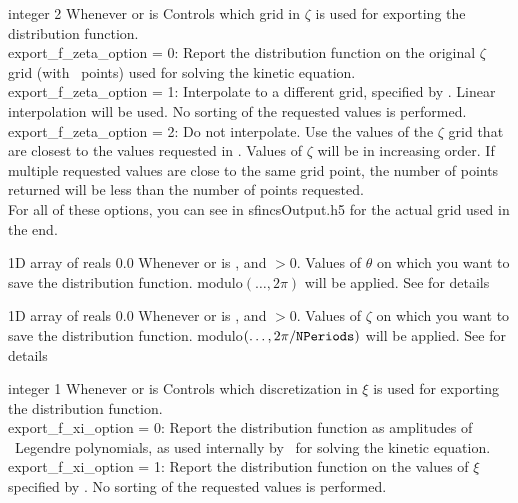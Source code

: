 \myhrule

{integer}
{2}
{Whenever  or  is \true}
{Controls which grid in $\zeta$ is used for exporting the distribution function.\\

{\ttfamily export\_f\_zeta\_option} = 0: Report the distribution function on the original $\zeta$ grid (with \Nzeta~points) used for solving the kinetic equation.\\

{\ttfamily export\_f\_zeta\_option} = 1: Interpolate to a different grid, specified by . Linear interpolation will be used.
No sorting of the requested values is performed.\\

{\ttfamily export\_f\_zeta\_option} = 2: Do not interpolate. Use the
values of the $\zeta$ grid that are closest to the values requested
in .  Values of $\zeta$ will be in
increasing order. If multiple requested values are close to the same
grid point, the number of points returned will be less than the number
of points requested. \\

For all of these options, you can see  in {\ttfamily sfincsOutput.h5} for the actual grid used in the end.
}

\myhrule

{1D array of reals}
{0.0}
{Whenever  or  is \true, and  $>0$.}
{Values of $\theta$ on which you want to save the distribution function.  modulo$(\ldots, 2\pi)$ will be applied.  See  for details}


\myhrule

{1D array of reals}
{0.0}
{Whenever  or  is \true, and  $>0$.}
{Values of $\zeta$ on which you want to save the distribution function.  modulo$(\ldots, 2\pi/\mbox{\ttfamily NPeriods})$ will be applied.  See  for details}

\myhrule

{integer}
{1}
{Whenever  or  is \true}
{Controls which discretization in $\xi$ is used for exporting the distribution function.\\

{\ttfamily export\_f\_xi\_option} = 0: Report the distribution function as amplitudes of \Nxi~Legendre polynomials, as used internally by \sfincs~for solving the kinetic equation.\\

{\ttfamily export\_f\_xi\_option} = 1: Report the distribution function on the values of $\xi$ specified by . No sorting of the requested values is performed.
}

